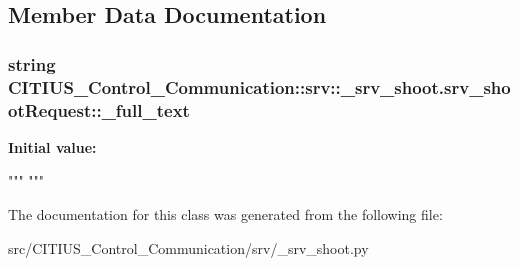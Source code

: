 \subsection{\-Member \-Data \-Documentation}
\hypertarget{class_c_i_t_i_u_s___control___communication_1_1srv_1_1__srv__shoot_1_1srv__shoot_request_a4a5a5126bc48eec9869d41024f1442d6}{
\subsubsection[{\-\_\-full\-\_\-text}]{\setlength{\rightskip}{0pt plus 5cm}string \-C\-I\-T\-I\-U\-S\-\_\-\-Control\-\_\-\-Communication\-::srv\-::\-\_\-srv\-\_\-shoot.\-srv\-\_\-shoot\-Request\-::\-\_\-full\-\_\-text}}\label{class_c_i_t_i_u_s___control___communication_1_1srv_1_1__srv__shoot_1_1srv__shoot_request_a4a5a5126bc48eec9869d41024f1442d6}
{\bfseries \-Initial value\-:}
\begin{DoxyCode}
"""
"""
\end{DoxyCode}


\-The documentation for this class was generated from the following file\-:\begin{DoxyCompactItemize}
\item 
src/\-C\-I\-T\-I\-U\-S\-\_\-\-Control\-\_\-\-Communication/srv/\-\_\-srv\-\_\-shoot.\-py\end{DoxyCompactItemize}
